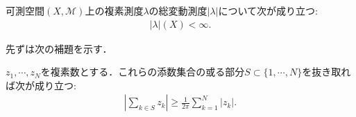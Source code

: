 	\begin{itembox}[l]{}	
		\begin{thm}[総変動測度は有界]
			可測空間$(X,\mathcal{M})$上の複素測度$\lambda$の総変動測度$|\lambda|$について次が成り立つ:
			\begin{align}
				|\lambda|(X) < \infty.
			\end{align}
			\label{thm:total_variation_measure_bounded}
		\end{thm}
	\end{itembox}
	
	先ずは次の補題を示す．
	
	\begin{itembox}[l]{}
		\begin{lem}
			$z_1,\cdots,z_N$を複素数とする．これらの添数集合の或る部分$S \subset \{1,\cdots,N\}$を抜き取れば次が成り立つ:
			\begin{align}
				\left| \sum_{k \in S} z_k \right| \geq \frac{1}{2\pi} \sum_{k=1}^{N} |z_k|.
			\end{align}
			\label{lem:total_variation_measure_bounded}
		\end{lem}
	\end{itembox}
	
